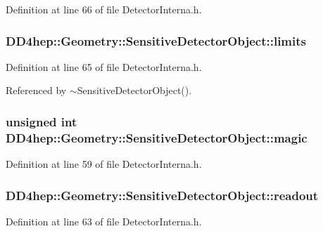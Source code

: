 Definition at line 66 of file DetectorInterna.h.\hypertarget{class_d_d4hep_1_1_geometry_1_1_sensitive_detector_object_a46aaaef7d8eaba09dc9f7cc77c903d40}{
\subsubsection[{limits}]{ {\bf DD4hep::Geometry::SensitiveDetectorObject::limits}}}
\label{class_d_d4hep_1_1_geometry_1_1_sensitive_detector_object_a46aaaef7d8eaba09dc9f7cc77c903d40}


Definition at line 65 of file DetectorInterna.h.

Referenced by $\sim$SensitiveDetectorObject().\hypertarget{class_d_d4hep_1_1_geometry_1_1_sensitive_detector_object_aa4d14ed3d51869d676732f3f19769baa}{
\subsubsection[{magic}]{\setlength{\rightskip}{0pt plus 5cm}unsigned int {\bf DD4hep::Geometry::SensitiveDetectorObject::magic}}}
\label{class_d_d4hep_1_1_geometry_1_1_sensitive_detector_object_aa4d14ed3d51869d676732f3f19769baa}


Definition at line 59 of file DetectorInterna.h.\hypertarget{class_d_d4hep_1_1_geometry_1_1_sensitive_detector_object_a2bdcbb790c3ef059c619c250e082688d}{
\subsubsection[{readout}]{ {\bf DD4hep::Geometry::SensitiveDetectorObject::readout}}}
\label{class_d_d4hep_1_1_geometry_1_1_sensitive_detector_object_a2bdcbb790c3ef059c619c250e082688d}


Definition at line 63 of file DetectorInterna.h.

